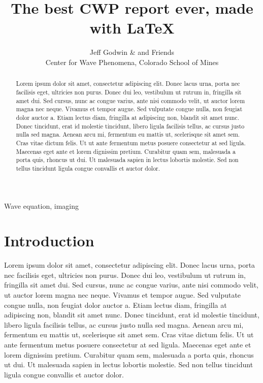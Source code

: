 
\title[Best CWP report ever]{The best CWP report ever, made with \LaTeX}
\author[J.~Godwin \& Friends]{Jeff Godwin \& and Friends \\
Center for Wave Phenomena, Colorado School of Mines}

\maketitle

\setcounter{page}{77}

\begin{keywords}
Wave equation, imaging
\end{keywords}

\begin{abstract}
Lorem ipsum dolor sit amet, consectetur adipiscing elit. Donec lacus urna, porta nec facilisis eget, ultricies non purus. Donec dui leo, vestibulum ut rutrum in, fringilla sit amet dui. Sed cursus, nunc ac congue varius, ante nisi commodo velit, ut auctor lorem magna nec neque. Vivamus et tempor augue. Sed vulputate congue nulla, non feugiat dolor auctor a. Etiam lectus diam, fringilla at adipiscing non, blandit sit amet nunc. Donec tincidunt, erat id molestie tincidunt, libero ligula facilisis tellus, ac cursus justo nulla sed magna. Aenean arcu mi, fermentum eu mattis ut, scelerisque sit amet sem. Cras vitae dictum felis. Ut ut ante fermentum metus posuere consectetur at sed ligula. Maecenas eget ante et lorem dignissim pretium. Curabitur quam sem, malesuada a porta quis, rhoncus ut dui. Ut malesuada sapien in lectus lobortis molestie. Sed non tellus tincidunt ligula congue convallis et auctor dolor.
\end{abstract}

\section{Introduction}

Lorem ipsum dolor sit amet, consectetur adipiscing elit. Donec lacus urna, porta nec facilisis eget, ultricies non purus. Donec dui leo, vestibulum ut rutrum in, fringilla sit amet dui. Sed cursus, nunc ac congue varius, ante nisi commodo velit, ut auctor lorem magna nec neque. Vivamus et tempor augue. Sed vulputate congue nulla, non feugiat dolor auctor a. Etiam lectus diam, fringilla at adipiscing non, blandit sit amet nunc. Donec tincidunt, erat id molestie tincidunt, libero ligula facilisis tellus, ac cursus justo nulla sed magna. Aenean arcu mi, fermentum eu mattis ut, scelerisque sit amet sem. Cras vitae dictum felis. Ut ut ante fermentum metus posuere consectetur at sed ligula. Maecenas eget ante et lorem dignissim pretium. Curabitur quam sem, malesuada a porta quis, rhoncus ut dui. Ut malesuada sapien in lectus lobortis molestie. Sed non tellus tincidunt ligula congue convallis et auctor dolor.

